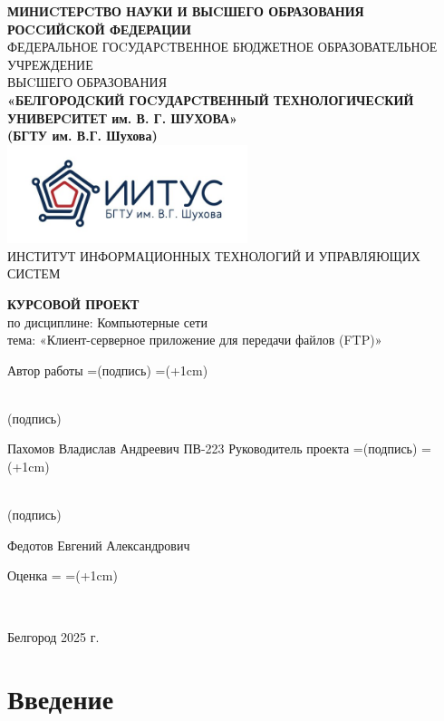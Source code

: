 \documentclass[a4paper,14pt]{extarticle}
\def\signature#1{%
    \setbox\namebox=\hbox{#1}
    \signboxdim=\dimexpr(\wd\namebox+1cm)
    \parbox[t]{\signboxdim}{%
        \centering
            \hrulefill\\    %
            #1
        \par}%
    }
\begin{document}
\linespread{1.5}
\justifying
\begin{center}
    \small{
        \textbf{МИНИCТЕРCТВО НАУКИ И ВЫCШЕГО ОБРАЗОВАНИЯ РОCCИЙCКОЙ ФЕДЕРАЦИИ}\\
        ФЕДЕРАЛЬНОЕ ГОCУДАРCТВЕННОЕ БЮДЖЕТНОЕ ОБРАЗОВАТЕЛЬНОЕ УЧРЕЖДЕНИЕ\\ВЫCШЕГО ОБРАЗОВАНИЯ \\
        \textbf{«БЕЛГОРОДCКИЙ ГОCУДАРCТВЕННЫЙ ТЕХНОЛОГИЧЕCКИЙ\\УНИВЕРCИТЕТ им. В. Г. ШУХОВА»\\ (БГТУ им. В.Г. Шухова)} \\
        \bigbreak
        \includegraphics[width=70mm]{log}\\
        ИНСТИТУТ ИНФОРМАЦИОННЫХ ТЕХНОЛОГИЙ И УПРАВЛЯЮЩИХ СИСТЕМ\\}
\end{center}

\vfill
\begin{center}
    \large{
        \textbf{
            КУРСОВОЙ ПРОЕКТ}}\\
    \normalsize{
        по дисциплине: Компьютерные сети \\
        тема: «Клиент-серверное приложение для передачи файлов (FTP)»}
\end{center}
\vfill
\begin{center}
    Автор работы \signature{\small{(подпись)}} Пахомов Владислав Андреевич ПВ-223\bigbreak
    Руководитель проекта \signature{\small{(подпись)}} Федотов Евгений Александрович
\end{center}
\vfill
\begin{center}
    Оценка \signature{}
\end{center}
\vfill\begin{center}
    Белгород 2025 г.
\end{center}
\newpage

\renewcommand{\contentsname}{Оглавление}
\thispagestyle{empty}
\tableofcontents
\newpage

\setlength{\parindent}{1.25cm}

\section{Введение}
\end{document}
